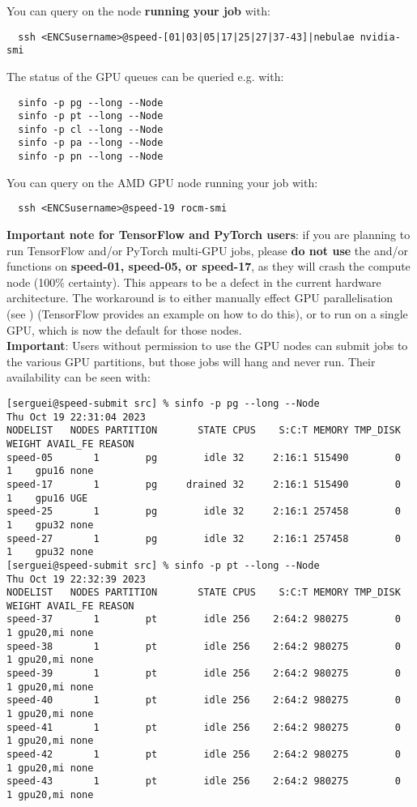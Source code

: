 \noindent
You can query  on the node \textbf{running your job} with:
\begin{verbatim}
  ssh <ENCSusername>@speed-[01|03|05|17|25|27|37-43]|nebulae nvidia-smi
\end{verbatim}

\noindent The status of the GPU queues can be queried e.g. with:
\begin{verbatim}
  sinfo -p pg --long --Node
  sinfo -p pt --long --Node
  sinfo -p cl --long --Node
  sinfo -p pa --long --Node
  sinfo -p pn --long --Node
\end{verbatim}

\noindent
You can query  on the AMD GPU node running your job with:
\begin{verbatim}
  ssh <ENCSusername>@speed-19 rocm-smi
\end{verbatim}

\noindent
\textbf{Important note for TensorFlow and PyTorch users}:
if you are planning to run TensorFlow and/or PyTorch multi-GPU jobs, please
\textbf{do not use} the  and/or  functions 
on \textbf{speed-01, speed-05, or speed-17}, as they will crash the compute node (100\% certainty). 
This appears to be a defect in the current hardware architecture.
%
The workaround is to either manually effect GPU parallelisation (see )
(TensorFlow provides an example on how to do this), or to run on a single GPU,
which is now the default for those nodes.\\

\noindent \textbf{Important}:
Users without permission to use the GPU nodes can submit jobs to the various GPU
partitions, but those jobs will hang and never run.
Their availability can be seen with:
%
\small
\begin{verbatim}
[serguei@speed-submit src] % sinfo -p pg --long --Node
Thu Oct 19 22:31:04 2023
NODELIST   NODES PARTITION       STATE CPUS    S:C:T MEMORY TMP_DISK WEIGHT AVAIL_FE REASON
speed-05       1        pg        idle 32     2:16:1 515490        0      1    gpu16 none
speed-17       1        pg     drained 32     2:16:1 515490        0      1    gpu16 UGE
speed-25       1        pg        idle 32     2:16:1 257458        0      1    gpu32 none
speed-27       1        pg        idle 32     2:16:1 257458        0      1    gpu32 none
[serguei@speed-submit src] % sinfo -p pt --long --Node
Thu Oct 19 22:32:39 2023
NODELIST   NODES PARTITION       STATE CPUS    S:C:T MEMORY TMP_DISK WEIGHT AVAIL_FE REASON
speed-37       1        pt        idle 256    2:64:2 980275        0      1 gpu20,mi none
speed-38       1        pt        idle 256    2:64:2 980275        0      1 gpu20,mi none
speed-39       1        pt        idle 256    2:64:2 980275        0      1 gpu20,mi none
speed-40       1        pt        idle 256    2:64:2 980275        0      1 gpu20,mi none
speed-41       1        pt        idle 256    2:64:2 980275        0      1 gpu20,mi none
speed-42       1        pt        idle 256    2:64:2 980275        0      1 gpu20,mi none
speed-43       1        pt        idle 256    2:64:2 980275        0      1 gpu20,mi none
\end{verbatim}
\normalsize

